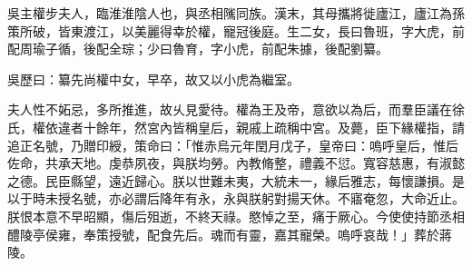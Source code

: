 
\begin{pinyinscope}
吳主權步夫人，臨淮淮陰人也，與丞相隲同族。漢末，其母攜將徙廬江，廬江為孫策所破，皆東渡江，以美麗得幸於權，寵冠後庭。生二女，長曰魯班，字大虎，前配周瑜子循，後配全琮；少曰魯育，字小虎，前配朱據，後配劉纂。

吳歷曰：纂先尚權中女，早卒，故又以小虎為繼室。

夫人性不妬忌，多所推進，故乆見愛待。權為王及帝，意欲以為后，而羣臣議在徐氏，權依違者十餘年，然宮內皆稱皇后，親戚上疏稱中宮。及薨，臣下緣權指，請追正名號，乃贈印綬，策命曰：「惟赤烏元年閏月戊子，皇帝曰：嗚呼皇后，惟后佐命，共承天地。虔恭夙夜，與朕均勞。內教脩整，禮義不愆。寬容慈惠，有淑懿之德。民臣縣望，遠近歸心。朕以世難未夷，大統未一，緣后雅志，每懷謙損。是以于時未授名號，亦必謂后降年有永，永與朕躬對揚天休。不寤奄忽，大命近止。朕恨本意不早昭顯，傷后殂逝，不終天祿。愍悼之至，痛于厥心。今使使持節丞相醴陵亭侯雍，奉策授號，配食先后。魂而有靈，嘉其寵榮。嗚呼哀哉！」葬於蔣陵。


\end{pinyinscope}